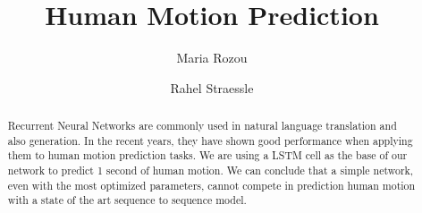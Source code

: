 \documentclass[sigconf]{acmart}
\begin{document}
\title{Human Motion Prediction}

\author{Maria Rozou}\affiliation{}

\author{Rahel Straessle}\affiliation{}

\begin{abstract}
Recurrent Neural Networks are commonly used in natural language translation and also generation. In the recent years, they have shown good performance when applying them to human motion prediction tasks. We are using a LSTM cell as the base of our network to predict 1 second of human motion. We can conclude that a simple network, even with the most optimized parameters, cannot compete in prediction human motion with a state of the art sequence to sequence model.
\end{abstract}

\maketitle





\end{document}
